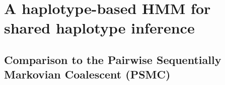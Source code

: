 






%
%
%
%


%
\section{A haplotype-based HMM for shared haplotype inference}
%

%

%



%
\subsection{Comparison to the Pairwise Sequentially Markovian Coalescent (PSMC)}
%


